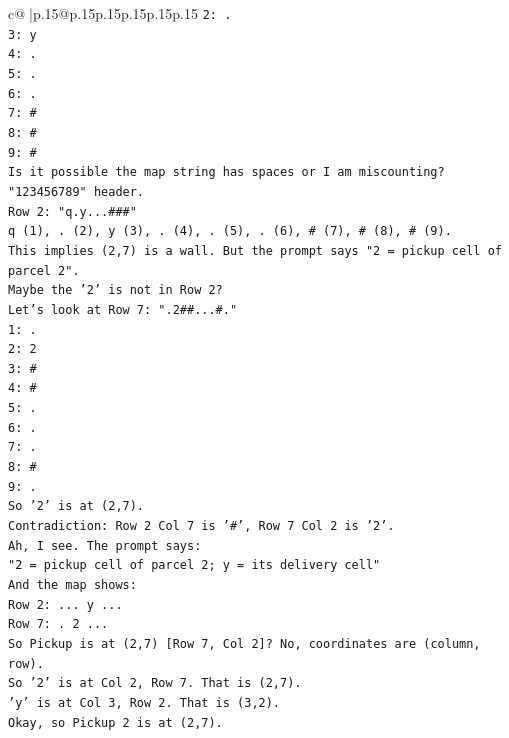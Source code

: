 \documentclass{article}
\begin{document}
{\begin{supertabular}{c@{$\;$}|p{.15\linewidth}@{}p{.15\linewidth}p{.15\linewidth}p{.15\linewidth}p{.15\linewidth}p{.15\linewidth}}
{{{\texttt{2: .} \\
\texttt{3: y} \\
\texttt{4: .} \\
\texttt{5: .} \\
\texttt{6: .} \\
\texttt{7: \#} \\
\texttt{8: \#} \\
\texttt{9: \#} \\
\texttt{Is it possible the map string has spaces or I am miscounting?} \\
\texttt{"123456789" header.} \\
\texttt{Row 2: "q.y...\#\#\#"} \\
\texttt{q (1), . (2), y (3), . (4), . (5), . (6), \# (7), \# (8), \# (9).} \\
\texttt{This implies (2,7) is a wall. But the prompt says "2 = pickup cell of parcel 2".} \\
\texttt{Maybe the '2' is not in Row 2?} \\
\texttt{Let's look at Row 7: ".2\#\#...\#."} \\
\texttt{1: .} \\
\texttt{2: 2} \\
\texttt{3: \#} \\
\texttt{4: \#} \\
\texttt{5: .} \\
\texttt{6: .} \\
\texttt{7: .} \\
\texttt{8: \#} \\
\texttt{9: .} \\
\texttt{So '2' is at (2,7).} \\
\texttt{Contradiction: Row 2 Col 7 is '\#', Row 7 Col 2 is '2'.} \\
\texttt{Ah, I see. The prompt says:} \\
\texttt{"2 = pickup cell of parcel 2; y = its delivery cell"} \\
\texttt{And the map shows:} \\
\texttt{Row 2: ... y ...} \\
\texttt{Row 7: . 2 ...} \\
\texttt{So Pickup is at (2,7) {[}Row 7, Col 2{]}? No, coordinates are (column, row).} \\
\texttt{So '2' is at Col 2, Row 7. That is (2,7).} \\
\texttt{'y' is at Col 3, Row 2. That is (3,2).} \\
\texttt{Okay, so Pickup 2 is at (2,7).} \\
}}}
\end{supertabular}}
\end{document}
